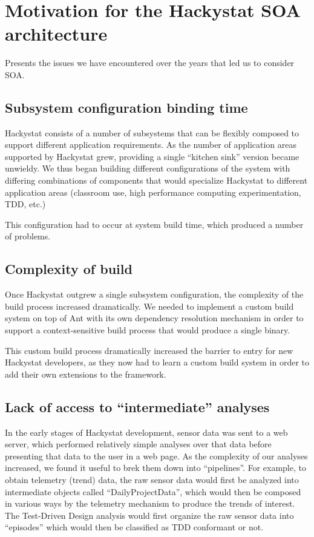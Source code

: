 \documentclass[conference,12pt]{IEEEtran}
\begin{document}
\section{Motivation for the Hackystat SOA architecture}
\label{sec:motivation}

Presents the issues we have encountered over the years that led us to consider SOA.

\subsection{Subsystem configuration binding time}

Hackystat consists of a number of subsystems that can be flexibly composed to support different application requirements.  As the number of application areas supported by Hackystat grew, providing a single ``kitchen sink'' version became unwieldy.  We thus began building different configurations of the system with differing combinations of components that would specialize Hackystat to different application areas (classroom use, high performance computing experimentation, TDD, etc.) 

This configuration had to occur at system build time, which produced a number of problems.

\subsection{Complexity of build}

Once Hackystat outgrew a single subsystem configuration, the complexity of the build process increased dramatically. We needed to implement a custom build system on top of Ant with its own dependency resolution mechanism in order to support a context-sensitive build process that would produce a single binary.  

This custom build process dramatically increased the barrier to entry for new Hackystat developers, as they now had to learn a custom build system in order to add their own extensions to the framework.

\subsection{Lack of access to ``intermediate'' analyses}

In the early stages of Hackystat development, sensor data was sent to a web server, which performed relatively simple analyses over that data before presenting that data to the user in a web page.   As the complexity of our analyses increased, we found it useful to brek them down into ``pipelines''.  For example, to obtain telemetry (trend) data, the raw sensor data would first be analyzed into intermediate objects called ``DailyProjectData'', which would then be composed in various ways by the telemetry mechanism to produce the trends of interest.  The Test-Driven Design analysis would first organize the raw sensor data into ``episodes'' which would then be classified as TDD conformant or not. 
\end{document}
